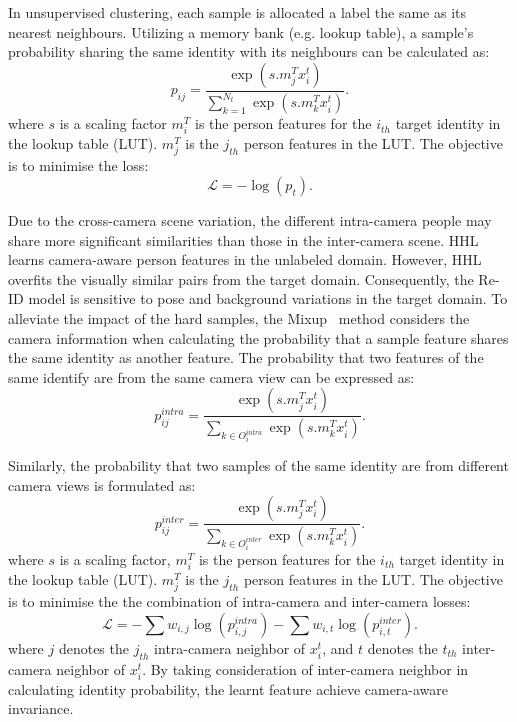 \documentclass[a4paper,fleqn]{cas-dc}
\begin{document}
In unsupervised clustering, each sample is allocated a label the same as its nearest neighbours. Utilizing a memory bank (e.g. lookup table), a sample's probability sharing the same identity with its neighbours can be calculated as: 
\begin{equation} \label{eq:oimprob}
p_{ij} = \frac{\exp(s.m_j^Tx_i^t)}{\sum_{k=1}^{N_t}\exp(s.m_k^Tx_i^t)}.
\end{equation}
where $s$ is a scaling factor $m_i^T$ is the person features for the $i_{th}$ target identity in the lookup table (LUT). $m_j^T$ is the $j_{th}$ person features in the LUT. The objective is to minimise the loss:
\begin{equation} \label{eq:oimloss}
\mathcal{L} = -\log(p_t). 
\end{equation}

Due to the cross-camera scene variation, the different intra-camera people may share more significant similarities than those in the inter-camera scene. HHL~\cite{zhong_generalizing_2018} learns camera-aware person features in the unlabeled domain. However, HHL overfits the visually similar pairs from the target domain. Consequently, the Re-ID model is sensitive to pose and background variations in the target domain. To alleviate the impact of the hard samples, the Mixup~\cite{vedaldi_generalizing_2020} method considers the camera information when calculating the probability that a sample feature shares the same identity as another feature. The probability that two features of the same identify are from the same camera view can be expressed as:
\begin{equation} \label{eq:intra}
p_{ij}^{intra} = \frac{\exp(s.m_j^Tx_i^t)}{\sum_{k \in O_i^{intra}}\exp(s.m_k^Tx_i^t)}.
\end{equation}

Similarly, the probability that two samples of the same identity are from different camera views is formulated as:
\begin{equation} \label{eq:inter}
p_{ij}^{inter} = \frac{\exp(s.m_j^Tx_i^t)}{\sum_{k \in O_i^{inter}}\exp(s.m_k^Tx_i^t)}.
\end{equation}
where $s$ is a scaling factor, $m_i^T$ is the person features for the $i_{th}$ target identity in the lookup table (LUT). $m_j^T$ is the $j_{th}$ person features in the LUT. The objective is to minimise the the combination of intra-camera and inter-camera losses:
\begin{equation} \label{eq:oimloss}
\mathcal{L} = -\sum w_{i,j}\log(p_{i,j}^{intra})-\sum w_{i,t}\log(p_{i,t}^{inter}). 
\end{equation}
where $j$ denotes the $j_{th}$ intra-camera neighbor of $x_i^t$, and $t$ denotes the $t_{th}$ inter-camera neighbor of $x_i^t$. By taking consideration of inter-camera neighbor in calculating identity probability, the learnt feature achieve camera-aware invariance.
\end{document}
